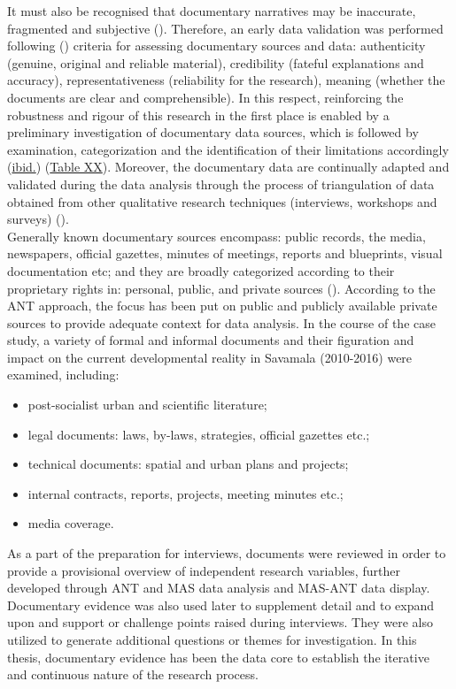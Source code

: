 \documentclass[11pt]{report}
\begin{document}
It must also be recognised that documentary narratives may be inaccurate, fragmented and subjective (\href{Foster}{\citealt{foster_power_1994}}). 
Therefore, an early data validation was performed following (\href{Scott}{\citealt{scott_matter_1991}}) criteria for assessing documentary sources and data: authenticity (genuine, original and reliable material), credibility (fateful explanations and accuracy), representativeness (reliability for the research), meaning (whether the documents are clear and comprehensible). In this respect, reinforcing the robustness and rigour of this research in the first place is enabled by a preliminary investigation of documentary data sources, which is followed by examination, categorization and the identification of their limitations accordingly (\href{Scott}{ibid.}) (\href{Table Data sources}{Table XX}). Moreover, the documentary data are continually adapted and validated during the data analysis through the process of triangulation of data obtained from other qualitative research techniques (interviews, workshops and surveys) 
 (\href{Yin}{\citealt{yin_case_2003}}).
\\

Generally known documentary sources encompass: public records, the media, newspapers, official gazettes, minutes of meetings, reports and blueprints, visual documentation etc; and they are broadly categorized according to their proprietary rights in: personal, public, and private sources (\href{Payne}{\citealt{payne_key_2004}}). According to the ANT approach, the focus has been put on public and publicly available private sources to provide adequate context for data analysis. In the course of the case study, a variety of formal and informal documents and their figuration and impact on the current developmental reality in Savamala (2010-2016) were examined, including:

\begin{itemize}
\item post-socialist urban and scientific literature;
\item legal documents: laws, by-laws, strategies, official gazettes etc.;
\item technical documents: spatial and urban plans and projects;
\item internal contracts, reports, projects, meeting minutes etc.;
\item media coverage. 
\end{itemize}

As a part of the preparation for interviews, documents were reviewed in order to provide a provisional overview of independent research variables, further developed through ANT and MAS data analysis and MAS-ANT data display. Documentary evidence was also used later to supplement detail and to expand upon and support or challenge points raised during interviews. They were also utilized to generate additional questions or themes for investigation. In this thesis, documentary evidence has been the data core to establish the iterative and continuous nature of the research process. 
\end{document}
